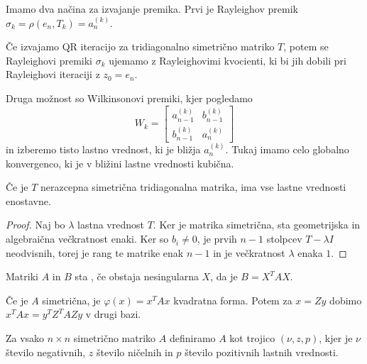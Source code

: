 Imamo dva načina za izvajanje premika.
Prvi je Rayleighov premik $\sigma_k = \rho(e_n, T_k) = a_n^{(k)}$.

\begin{izrek}
  Če izvajamo QR iteracijo za tridiagonalno simetrično matriko $T$, potem se
  Rayleighovi premiki $\sigma_k$ ujemamo z Rayleighovimi kvocienti, ki bi jih
  dobili pri Rayleighovi iteraciji z $z_0 = e_n$.
\end{izrek}


Druga možnost so Wilkinsonovi premiki, kjer pogledamo
\[
  W_k =
  \begin{bmatrix}
	a_{n-1}^{(k)} & b_{n-1}^{(k)} \\
	b_{n-1}^{(k)} & a_n^{(k)}
  \end{bmatrix}
\]
in izberemo tisto lastno vrednost, ki je bližja $a_n^{(k)}$.
Tukaj imamo celo globalno konvergenco, ki je v bližini lastne vrednosti kubična.



\begin{izrek}
  Če je $T$ nerazcepna simetrična tridiagonalna matrika, ima vse lastne
  vrednosti enostavne.
\end{izrek}

\begin{proof}
  Naj bo $\lambda$ lastna vrednost $T$.
  Ker je matrika simetrična, sta geometrijska in algebraična večkratnost enaki.
  Ker so $b_i \ne 0$, je prvih $n-1$ stolpcev $T - \lambda I$ neodvisnih, torej
  je rang te matrike enak $n-1$ in je večkratnost $\lambda$ enaka $1$.
\end{proof}


\begin{definicija}
  Matriki $A$ in $B$ sta , če obstaja nesingularna $X$, da je
  $B = X^T A X$.
\end{definicija}

Če je $A$ simetrična, je $\varphi(x) = x^T A x$ kvadratna forma.
Potem za $x = Zy$ dobimo $x^T A x = y^T Z^T A Z y$ v drugi bazi.

\begin{definicija}
  Za vsako $n \times n$ simetrično matriko $A$ definiramo  $A$
  kot trojico $(\nu, z, p)$, kjer je $\nu$ število negativnih, $z$ število
  ničelnih in $p$ število pozitivnih lastnih vrednosti.
\end{definicija}

